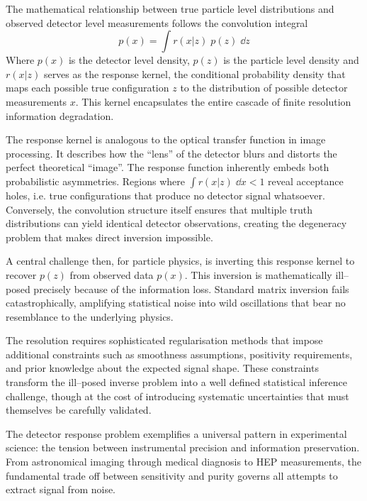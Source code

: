 \begin{definition}
    The mathematical relationship between true particle level distributions and observed detector level measurements follows the convolution integral
    \[
        \label{eq:forward-folding}
        p(x) = \int r(x|z)\;p(z)\; \dd z
    \]
    Where \(p(x)\) is the detector level density, \(p(z)\) is the particle level density and \(r(x|z)\) serves as the response kernel, the conditional probability density that maps each possible true configuration \(z\) to the distribution of possible detector measurements \(x\).
    This kernel encapsulates the entire cascade of finite resolution information degradation.
    
    The response kernel is analogous to the optical transfer function in image processing.
    It describes how the ``lens'' of the detector blurs and distorts the perfect theoretical ``image''.
    The response function inherently embeds both probabilistic asymmetries.
    Regions where \(\int r(x|z)\;\dd x < 1\) reveal acceptance holes, i.e. true configurations that produce no detector signal whatsoever.
    Conversely, the convolution structure itself ensures that multiple truth distributions can yield identical detector observations, creating the degeneracy problem that makes direct inversion impossible.
    
    A central challenge then, for particle physics, is inverting this response kernel to recover \(p(z)\) from observed data \(p(x)\).
    This inversion is mathematically ill--posed precisely because of the information loss.
    Standard matrix inversion fails catastrophically, amplifying statistical noise into wild oscillations that bear no resemblance to the underlying physics.
    
    The resolution requires sophisticated regularisation methods that impose additional constraints such as smoothness assumptions, positivity requirements, and prior knowledge about the expected signal shape.
    These constraints transform the ill--posed inverse problem into a well defined statistical inference challenge, though at the cost of introducing systematic uncertainties that must themselves be carefully validated.
    
    The detector response problem exemplifies a universal pattern in experimental science: the tension between instrumental precision and information preservation.
    From astronomical imaging through medical diagnosis to HEP measurements, the fundamental trade off between sensitivity and purity governs all attempts to extract signal from noise.


\end{definition}
